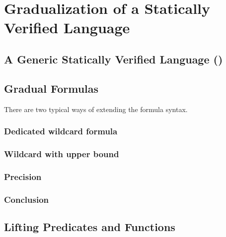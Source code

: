 \chapter{Gradualization of a Statically Verified Language}
\label{ch:gradualization-of-a}


\section{A Generic Statically Verified Language (\gsvl)}
\label{sec:a-statically-verified}


\section{Gradual Formulas}
\label{sec:gradual-formulas}


There are two typical ways of extending the formula syntax.
    \subsection{Dedicated wildcard formula}
    \label{ssec:dedicated-wildcard-formula}
    
    
    \subsection{Wildcard with upper bound}
    \label{ssec:wildcard-with-upper}
    

    \subsection{Precision}
    \label{ssec:precision}
    
    
    \subsection{Conclusion}
    \label{ssec:gfconclusion}
    
    

\section{Lifting Predicates and Functions}
\label{sec:lifting-predicates-and}


